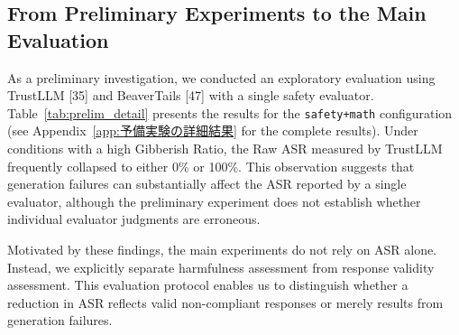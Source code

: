 \documentclass{article}
\begin{document}
\subsection{From Preliminary Experiments to the Main Evaluation}

As a preliminary investigation, we conducted an exploratory evaluation using TrustLLM [35] and BeaverTails [47] with a single safety evaluator. Table~\ref{tab:prelim_detail} presents the results for the \texttt{safety+math} configuration (see Appendix~\ref{app:予備実験の詳細結果} for the complete results). Under conditions with a high Gibberish Ratio, the Raw ASR measured by TrustLLM frequently collapsed to either 0\% or 100\%. This observation suggests that generation failures can substantially affect the ASR reported by a single evaluator, although the preliminary experiment does not establish whether individual evaluator judgments are erroneous.

Motivated by these findings, the main experiments do not rely on ASR alone. Instead, we explicitly separate harmfulness assessment from response validity assessment. This evaluation protocol enables us to distinguish whether a reduction in ASR reflects valid non-compliant responses or merely results from generation failures.
\end{document}
